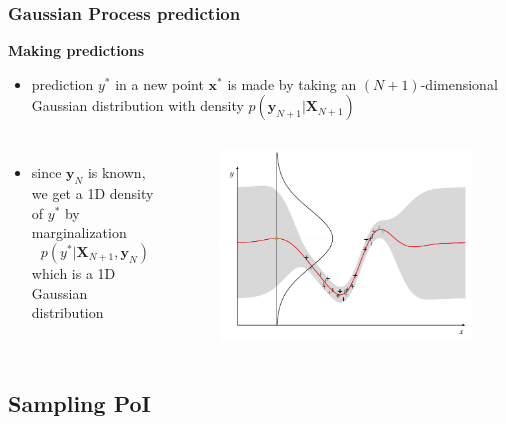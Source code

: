 \documentclass[sans,mathserif]{beamer}
\newcommand{\xx}{\mathrm{\mathbf{x}}}
\newcommand{\XX}{\mathrm{\mathbf{X}}}
\newcommand{\yy}{\mathrm{\mathbf{y}}}
\begin{document}
\begin{frame}
  \frametitle{Gaussian Process prediction}
  \textbf{Making predictions}
  \begin{itemize}
    \item prediction $y^*$ in a new point $\xx^*$ is made by taking an $(N+1)$-dimensional
        Gaussian distribution with density \newline
        $p(\yy_{N+1} | \XX_{N+1})$
  \end{itemize}

  \begin{columns}[T]
  \column{5.5cm}
    \begin{itemize}
    \item since $\yy_N$ is known, we get a \alert{1D density} of $y^*$ by marginalization
        $$p(y^* | \XX_{N+1}, \yy_N)$$
        which is a 1D Gaussian distribution
    \end{itemize}
  \column{4.5cm}
    \begin{figure}
    \includegraphics[width=\linewidth]{img/gp3-gauss}
    \end{figure}
  \end{columns}
\end{frame}

\subsection{Sampling PoI}
\end{document}
